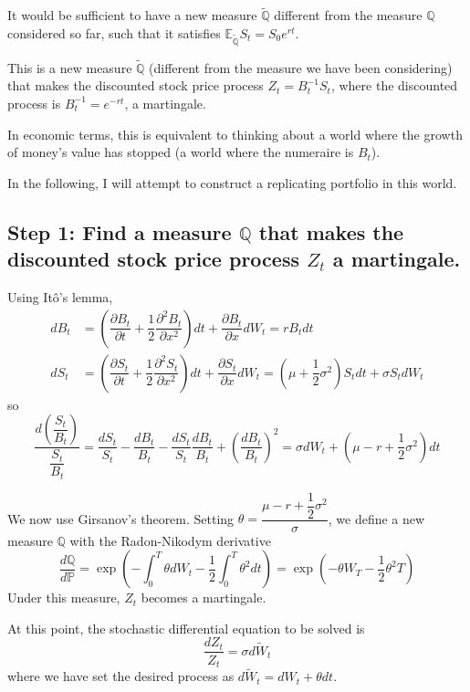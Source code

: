 \documentclass[uplatex,a4j,12pt,dvipdfmx]{jsarticle}
\begin{document}
It would be sufficient to have a new measure $\mathbb{\tilde Q}$ different from the measure $\mathbb{Q}$ considered so far, such that it satisfies $\mathbb{E}_{\mathbb{\tilde Q}}S_{t} = S_{0} e^{rt}$.

This is a new measure $\mathbb{\tilde Q}$ (different from the measure we have been considering) that makes the discounted stock price process $Z_{t} = B^{-1}_{t} S_{t}$, where the discounted process is $B^{-1}_{t}=e^{-rt}$, a martingale.

In economic terms, this is equivalent to thinking about a world where the growth of money's value has stopped (a world where the numeraire is $B_{t}$).

In the following, I will attempt to construct a replicating portfolio in this world.

\subsection{Step 1: Find a measure $\mathbb{Q}$ that makes the discounted stock price process $Z_{t}$ a martingale.}
Using Itô's lemma,
\begin{align*}
	dB_{t} & = \left( \dfrac{\partial B_{t}}{\partial t} + \dfrac{1}{2} \dfrac{\partial^{2} B_{t}}{\partial x^{2}} \right) dt + \dfrac{\partial B_{t}}{\partial x} dW_{t} = r B_{t} dt \\
	dS_{t} & = \left( \dfrac{\partial S_{t}}{\partial t} + \dfrac{1}{2} \dfrac{\partial^{2} S_{t}}{\partial x^{2}} \right) dt + \dfrac{\partial S_{t}}{\partial x} dW_{t} = \left( \mu + \dfrac{1}{2} \sigma^{2} \right) S_{t} dt + \sigma S_{t} dW_{t}
\end{align*}
so
$$ \dfrac{d \left( \dfrac{S_{t}}{B_{t}} \right) }{ \dfrac{S_{t}}{B_{t}} } = \dfrac{dS_{t}}{S_{t}} - \dfrac{dB_{t}}{B_{t}} - \dfrac{dS_{t}}{S_{t}} \dfrac{dB_{t}}{B_{t}} + \left( \dfrac{dB_{t}}{B_{t}} \right)^{2} = \sigma d W_{t} + \left( \mu - r + \dfrac{1}{2} \sigma^{2} \right) dt $$

We now use Girsanov's theorem. Setting $\theta = \dfrac{\mu - r + \dfrac{1}{2} \sigma^{2}}{\sigma}$, we define a new measure $\mathbb{Q}$ with the Radon-Nikodym derivative
$$ \dfrac{d \mathbb{Q}}{d \mathbb{P}} = \exp \left( - \int^{T}_{0} \theta d W_{t} - \dfrac{1}{2} \int^{T}_{0} \theta^{2} dt \right) = \exp \left( - \theta W_{T} - \dfrac{1}{2} \theta^{2} T \right) $$
Under this measure, $Z_{t}$ becomes a martingale.

At this point, the stochastic differential equation to be solved is
$$ \dfrac{dZ_{t}}{Z_{t}} = \sigma d \tilde{W}_{t} $$
where we have set the desired process as $d \tilde{W}_{t} = d W_{t} + \theta dt$.
\end{document}
